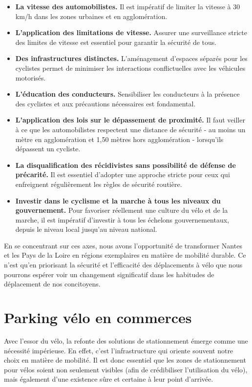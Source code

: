 \begin{itemize}
\item \textbf{La vitesse des automobilistes.} Il est impératif de
  limiter la vitesse à 30 km/h dans les zones urbaines et en
  agglomération.
\item \textbf{L'application des limitations de vitesse.} Assurer une
  surveillance stricte des limites de vitesse est essentiel pour
  garantir la sécurité de tous.
\item \textbf{Des infrastructures distinctes.} L'aménagement d'espaces
séparés pour les cyclistes permet de minimiser les interactions
conflictuelles avec les véhicules motorisés.
\item \textbf{L'éducation des conducteurs.} Sensibiliser les
  conducteurs à la présence des cyclistes et aux précautions
  nécessaires est fondamental.
\item \textbf{L'application des lois sur le dépassement de proximité.}
  Il faut veiller à ce que les automobilistes respectent une distance
  de sécurité - au moins un mètre en agglomération et 1,50 mètres hors
  agglomération - lorsqu'ils dépassent un cycliste.
\item \textbf{La disqualification des récidivistes sans possibilité de
    défense de précarité.} Il est essentiel d'adopter une approche
  stricte pour ceux qui enfreignent régulièrement les règles de
  sécurité routière.
\item \textbf{Investir dans le cyclisme et la marche à tous les
    niveaux du gouvernement.} Pour favoriser réellement une culture
  du vélo et de la marche, il est impératif d'investir à tous les
  échelons gouvernementaux, depuis le niveau local jusqu'au niveau
  national.
\end{itemize}

En se concentrant sur ces axes, nous avons l'opportunité de
transformer Nantes et les Pays de la Loire en régions exemplaires en
matière de mobilité durable. Ce n'est qu'en priorisant la sécurité et
l'efficacité des déplacements à vélo que nous pourrons espérer voir un
changement significatif dans les habitudes de déplacement de nos
concitoyens.


\section{Parking vélo en commerces}

Avec l’essor du vélo, la refonte des solutions de stationnement émerge
comme une nécessité impérieuse. En effet, c'est l'infrastructure qui
oriente souvent notre choix en matière de mobilité. Il est donc
essentiel que les zones de stationnement pour vélos soient non
seulement visibles (afin de crédibiliser l'utilisation du vélo), mais
également d'une existence sûre et certaine à leur point d'arrivée.

